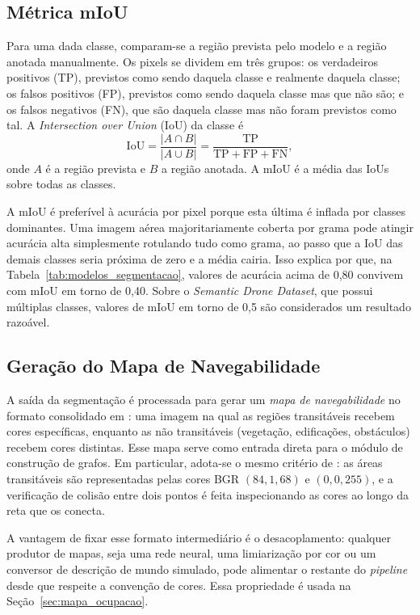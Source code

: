 \documentclass[
    12pt,
    openright,
    oneside,
    a4paper,
    english,
    brazil
]{abntex2}
\begin{document}
\subsection{Métrica mIoU}
\label{sec:miou}

Para uma dada classe, comparam-se a região prevista pelo modelo e a região anotada manualmente. Os pixels se dividem em três grupos: os verdadeiros positivos (TP), previstos como sendo daquela classe e realmente daquela classe; os falsos positivos (FP), previstos como sendo daquela classe mas que não são; e os falsos negativos (FN), que são daquela classe mas não foram previstos como tal. A \emph{Intersection over Union} (IoU) da classe é
\[
\mathrm{IoU} = \frac{|A \cap B|}{|A \cup B|} = \frac{\mathrm{TP}}{\mathrm{TP} + \mathrm{FP} + \mathrm{FN}},
\]
onde $A$ é a região prevista e $B$ a região anotada. A mIoU é a média das IoUs sobre todas as classes.

A mIoU é preferível à acurácia por pixel porque esta última é inflada por classes dominantes. Uma imagem aérea majoritariamente coberta por grama pode atingir acurácia alta simplesmente rotulando tudo como grama, ao passo que a IoU das demais classes seria próxima de zero e a média cairia. Isso explica por que, na Tabela~\ref{tab:modelos_segmentacao}, valores de acurácia acima de 0,80 convivem com mIoU em torno de 0,40. Sobre o \emph{Semantic Drone Dataset}, que possui múltiplas classes, valores de mIoU em torno de 0,5 são considerados um resultado razoável.

\subsection{Geração do Mapa de Navegabilidade}
\label{sec:mapa_navegabilidade}

A saída da segmentação é processada para gerar um \emph{mapa de navegabilidade} no formato consolidado em \cite{junior2025_rrt}: uma imagem na qual as regiões transitáveis recebem cores específicas, enquanto as não transitáveis (vegetação, edificações, obstáculos) recebem cores distintas. Esse mapa serve como entrada direta para o módulo de construção de grafos. Em particular, adota-se o mesmo critério de \cite{junior2025_rrt}: as áreas transitáveis são representadas pelas cores BGR $(84, 1, 68)$ e $(0, 0, 255)$, e a verificação de colisão entre dois pontos é feita inspecionando as cores ao longo da reta que os conecta.

A vantagem de fixar esse formato intermediário é o desacoplamento: qualquer produtor de mapas, seja uma rede neural, uma limiarização por cor ou um conversor de descrição de mundo simulado, pode alimentar o restante do \textit{pipeline} desde que respeite a convenção de cores. Essa propriedade é usada na Seção~\ref{sec:mapa_ocupacao}.
\end{document}
